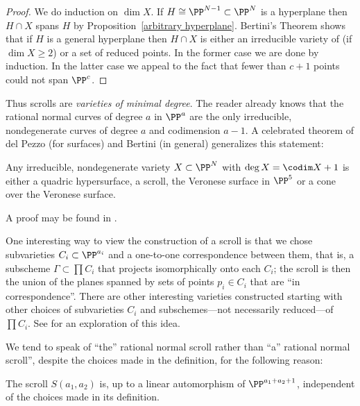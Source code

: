 \begin{proof} We do induction on $\dim X$. If $H\cong \PP^{N-1}\subset \PP^N$ is a hyperplane then $H\cap X$ spans
$H$ by Proposition~\ref{arbitrary hyperplane}. Bertini's Theorem shows that if $H$ is a general hyperplane then $H\cap X$ is either an irreducible variety of 
(if $\dim X\geq 2$) or a set of reduced points. In the former case we are done by induction. In the latter case
we appeal to the fact that fewer than $c+1$ points could not span $\PP^c$.
 \end{proof}

Thus scrolls are \emph{varieties of minimal degree}. The reader already knows that the rational normal curves of degree $a$ in $\PP^{a}$ are the only irreducible, nondegenerate curves of degree $a$ and codimension $a-1$. A celebrated theorem of del Pezzo (for surfaces) and Bertini (in general) generalizes this statement:

\begin{fact}\label{classification of scrolls} 
Any irreducible, nondegenerate variety $X\subset \PP^{N}$  with $\deg X = \codim X+1$ is either a quadric hypersurface, a scroll, the Veronese surface in $\PP^{5}$ or a cone over the Veronese surface.
\end{fact}

A proof may be found in \cite{Eisenbud-Harris-Centennial}.

One interesting way to view the construction of a scroll is that we chose subvarieties $C_{i}\subset \PP^{a_{i}}$ and a one-to-one correspondence between them, that is, a subscheme
$\Gamma\subset \prod C_{i}$ that projects isomorphically onto each $C_{i}$; the scroll is then the
union of the planes spanned by sets of points $p_{i}\in C_{i}$ that are ``in correspondence''. There are other interesting varieties constructed starting with other choices of subvarieties $C_{i}$ and subschemes---not necessarily reduced---of $\prod C_{i}$. See \cite{Eisenbud-Sammartano} for an exploration of this idea.

We tend to speak of ``the'' rational normal scroll rather than ``a'' rational normal scroll'', despite the choices made in the definition, for the following reason:

\begin{proposition}\label{uniqueness of scrolls}
The scroll $S(a_1,a_2)$ is, up to a linear automorphism of $\PP^{a_1+a_2+1}$, independent of the choices made in its
 definition. 
\end{proposition}

